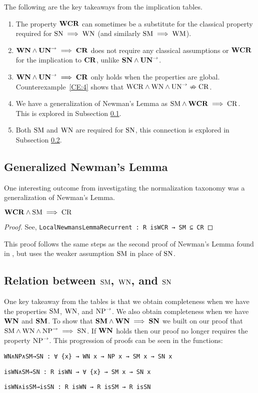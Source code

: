 \begin{remark} The following are the key takeaways from the implication tables. \hfill
    \begin{enumerate}
        \item The property $\mathbf{WCR}$ can sometimes be a substitute for the classical
        property required for $\mathrm{SN} \implies \mathrm{WN}$ (and similarly $\mathrm{SM} \implies \mathrm{WM}$).
        \item $\mathbf{WN} \land \mathbf{UN}^{\to} \implies \mathbf{CR}$ does not require any classical assumptions
         or $\mathbf{WCR}$ for the implication to $\mathbf{CR}$, unlike $\mathbf{SN} \land \mathbf{UN}^{\to}$.
        \item $\mathbf{WN} \land \mathbf{UN}^{\to} \implies \mathbf{CR}$ only holds when the properties are global. Counterexample~\ref{CE:4} shows that $\mathrm{WCR} \land \mathrm{WN} \land \mathrm{UN}^{\to} \nRightarrow \mathrm{CR}$.
        \item We have a generalization of Newman's Lemma as $\mathrm{SM} \land \mathbf{WCR} \implies \mathrm{CR}$. This is explored in Subsection \ref{subsec:newnewman}.
        \item Both $\mathrm{SM}$ and $\mathrm{WN}$ are required for $\mathrm{SN}$, this connection is explored in Subsection \ref{subsec:SMWNSN}.
    \end{enumerate}
\end{remark}

\subsection{Generalized Newman's Lemma}\label{subsec:newnewman}
One interesting outcome from investigating the normalization taxonomy was a generalization of Newman's Lemma.

\begin{proposition}
    $\mathbf{WCR} \land \mathrm{SM} \implies \mathrm{CR}$
\end{proposition}
\begin{proof}
    See, \verb|LocalNewmansLemmaRecurrent : R isWCR → SM ⊆ CR|
\end{proof}

This proof follows the same steps as the second proof of Newman's Lemma found in \terese, but
uses the weaker assumption $\mathrm{SM}$ in place of $\mathrm{SN}$.

\subsection{Relation between $\mathrm{SM}$, $\mathrm{WN}$, and $\mathrm{SN}$} \label{subsec:SMWNSN}
One key takeaway from the tables is that we obtain completeness when we have the properties $\mathrm{SM}$, $\mathrm{WN}$, and $\mathrm{NP}^{\to}$. We also
obtain completeness when we have $\mathbf{WN}$ and $\mathbf{SM}$.
To show that $\mathbf{SM} \land \mathbf{WN} \implies \mathbf{SN}$ we built on our proof that $\mathrm{SM} \land \mathrm{WN} \land \mathrm{NP}^{\to} \implies \mathrm{SN}$. If $\mathbf{WN}$ holds
then our proof no longer requires the property $\mathrm{NP}^{\to}$. This progression of proofs can be seen in the functions:

\verb|WN∧NP∧SM→SN : ∀ {x} → WN x → NP x → SM x → SN x|

\verb|isWN∧SM→SN : R isWN → ∀ {x} → SM x → SN x|

\verb|isWN∧isSM→isSN : R isWN → R isSM → R isSN|

